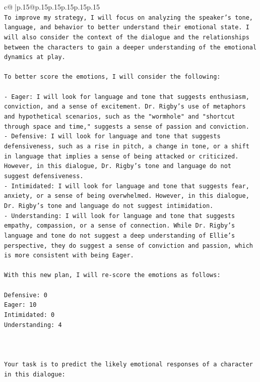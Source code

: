\documentclass{article}
\begin{document}
{\begin{supertabular}{c@{$\;$}|p{.15\linewidth}@{}p{.15\linewidth}p{.15\linewidth}p{.15\linewidth}p{.15\linewidth}p{.15\linewidth}}
{{{\\ 
\texttt{To improve my strategy, I will focus on analyzing the speaker's tone, language, and behavior to better understand their emotional state. I will also consider the context of the dialogue and the relationships between the characters to gain a deeper understanding of the emotional dynamics at play.} \\
\\ 
\texttt{To better score the emotions, I will consider the following:} \\
\\ 
\texttt{{-} Eager: I will look for language and tone that suggests enthusiasm, conviction, and a sense of excitement. Dr. Rigby's use of metaphors and hypothetical scenarios, such as the "wormhole" and "shortcut through space and time," suggests a sense of passion and conviction.} \\
\texttt{{-} Defensive: I will look for language and tone that suggests defensiveness, such as a rise in pitch, a change in tone, or a shift in language that implies a sense of being attacked or criticized. However, in this dialogue, Dr. Rigby's tone and language do not suggest defensiveness.} \\
\texttt{{-} Intimidated: I will look for language and tone that suggests fear, anxiety, or a sense of being overwhelmed. However, in this dialogue, Dr. Rigby's tone and language do not suggest intimidation.} \\
\texttt{{-} Understanding: I will look for language and tone that suggests empathy, compassion, or a sense of connection. While Dr. Rigby's language and tone do not suggest a deep understanding of Ellie's perspective, they do suggest a sense of conviction and passion, which is more consistent with being Eager.} \\
\\ 
\texttt{With this new plan, I will re{-}score the emotions as follows:} \\
\\ 
\texttt{Defensive: 0} \\
\texttt{Eager: 10} \\
\texttt{Intimidated: 0} \\
\texttt{Understanding: 4} \\
\\ 
\\ 
\\ 
\texttt{Your task is to predict the likely emotional responses of a character in this dialogue:} \\
}}}
\end{supertabular}}
\end{document}
